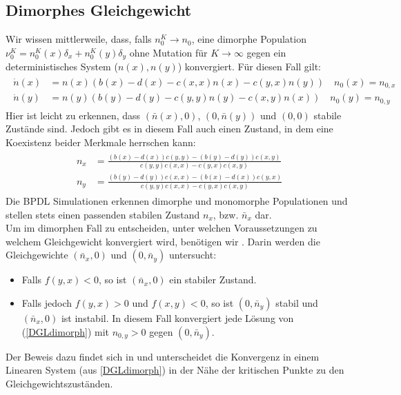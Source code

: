 \documentclass[11pt, a4paper, german]{article}
\theoremstyle{plain}
\begin{document}
	\subsection{Dimorphes Gleichgewicht}
		Wir wissen mittlerweile, dass, falls $ n_0^K \to n_0 $, eine dimorphe Population $ \nu_0^K = n_0^K(x) \delta_x + n_0^K(y) \delta_y $ ohne Mutation für $ K \to \infty $ gegen ein deterministisches System ($ n(x), n(y) $) konvergiert. Für diesen Fall gilt:
		\begin{align}
		\begin{split}
			\dot{n}(x) & = n(x) (b(x) - d(x) - c(x,x)n(x) - c(y,x) n(y)) \quad n_0(x) = n_{0,x} \\
			\dot{n}(y) & = n(y) (b(y) - d(y) - c(y,y)n(y) - c(x,y) n(x)) \quad n_0(y) = n_{0,y} \label{DGLdimorph}
		\end{split}
		\end{align}
		Hier ist leicht zu erkennen, dass $ (\bar{n}(x), 0) $, $ (0, \bar{n}(y)) $ und $ (0,0) $ stabile Zustände sind. Jedoch gibt es in diesem Fall auch einen Zustand, in dem eine Koexistenz beider Merkmale herrschen kann:
		\begin{align}
		\begin{split}
			n_x &= \frac{(b(x) - d(x))c(y,y)-(b(y)-d(y))c(x,y)}{c(y,y)c(x,x) - c(y,x)c(x,y)}\\
			n_y &= \frac{(b(y) - d(y))c(x,x)-(b(x)-d(x))c(y,x)}{c(y,y)c(x,x) - c(y,x)c(x,y)} \label{GleichgewichtDimorph}
		\end{split}
		\end{align}
		Die BPDL Simulationen erkennen dimorphe und monomorphe Populationen und stellen stets einen passenden stabilen Zustand $ n_x $, bzw. $ \bar{n}_x $ dar. \\
		Um im dimorphen Fall zu entscheiden, unter welchen Voraussetzungen zu welchem Gleichgewicht konvergiert wird, benötigen wir \cite[Proposition 3]{Champagnat20061127}. Darin werden die Gleichgewichte $ (\bar{n}_x, 0) $ und $ (0, \bar{n}_y) $ untersucht:
		\begin{itemize}
			\item[] Falls $ f(y,x) < 0 $, so ist $ (\bar{n}_x, 0) $ ein stabiler Zustand.
			\item[] Falls jedoch $ f(y,x) > 0 $ und $ f(x,y) < 0 $, so ist $ (0, \bar{n}_y) $ stabil und $ (\bar{n}_x, 0) $ ist instabil. In diesem Fall konvergiert jede Lösung von (\ref{DGLdimorph}) mit $ n_{0,y} > 0 $ gegen $ (0, \bar{n}_y) $.
		\end{itemize}
		Der Beweis dazu findet sich in \cite{Silke} und unterscheidet die Konvergenz in einem Linearen System (aus \ref{DGLdimorph}) in der Nähe der kritischen Punkte zu den Gleichgewichtszuständen.\\
\end{document}

